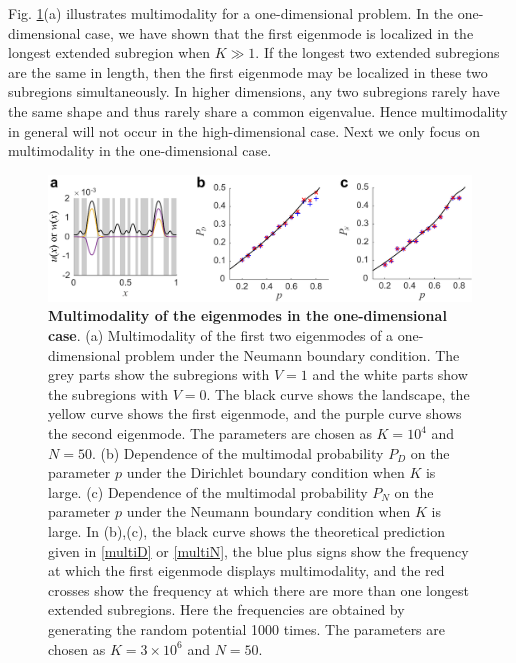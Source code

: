 \documentclass[a4paper,11pt]{article}
\begin{document}
Fig. \ref{fig4}(a) illustrates multimodality for a one-dimensional problem. In the one-dimensional case, we have shown that the first eigenmode is localized in the longest extended subregion when $K\gg 1$. If the longest two extended subregions are the same in length, then the first eigenmode may be localized in these two subregions simultaneously. In higher dimensions, any two subregions rarely have the same shape and thus rarely share a common eigenvalue. Hence multimodality in general will not occur in the high-dimensional case. Next we only focus on multimodality in the one-dimensional case.
\begin{figure}
\centering
\includegraphics[width=\linewidth]{Fig4}
\caption{\textbf{Multimodality of the eigenmodes in the one-dimensional case}. (a) Multimodality of the first two eigenmodes of a one-dimensional problem under the Neumann boundary condition. The grey parts show the subregions with $V = 1$ and the white parts show the subregions with $V = 0$. The black curve shows the landscape, the yellow curve shows the first eigenmode, and the purple curve shows the second eigenmode. The parameters are chosen as $K = 10^4$ and $N = 50$.
(b) Dependence of the multimodal probability $P_D$ on the parameter $p$ under the Dirichlet boundary condition when $K$ is large. (c) Dependence of the multimodal probability $P_N$ on the parameter $p$ under the Neumann boundary condition when $K$ is large. In (b),(c), the black curve shows the theoretical prediction given in \eqref{multiD} or \eqref{multiN}, the blue plus signs show the frequency at which the first eigenmode displays multimodality, and the red crosses show the frequency at which there are more than one longest extended subregions. Here the frequencies are obtained by generating the random potential 1000 times. The parameters are chosen as $K = 3 \times 10^6$ and $N = 50$.}
\label{fig4}
\end{figure}
\end{document}
